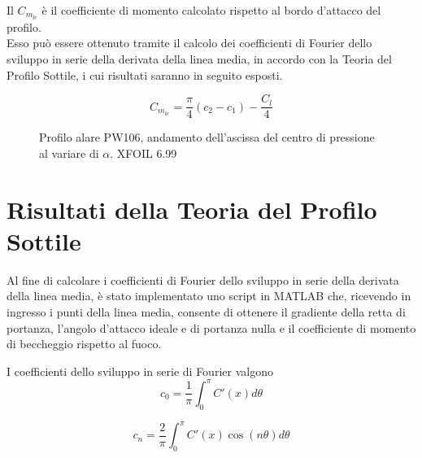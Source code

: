 Il $ C_{m_{le}}$ è il coefficiente di momento calcolato rispetto al bordo d’attacco del profilo. \\
Esso può essere ottenuto tramite il calcolo dei coefficienti di Fourier dello sviluppo in serie della derivata della linea media, in accordo con la Teoria del Profilo Sottile, i cui risultati saranno in seguito esposti.

\begin{equation}
\label{eqn:zerouno}
C_{m_{le}}= \frac {{\pi}}{4}(c_2-c_1)- \frac {C_l}{4}
\end{equation}

\begin{figure} [h!]
\centering
{}
\caption{\footnotesize Profilo alare PW106, andamento dell'ascissa del centro di pressione al variare di ${\alpha}$.  XFOIL 6.99}\label{fig:cp}
\end{figure}


\section{Risultati della Teoria del Profilo Sottile}

Al fine di calcolare i coefficienti di Fourier dello sviluppo in serie della derivata della linea media, è stato implementato uno script in MATLAB che, ricevendo in ingresso i punti della linea media, consente di ottenere il gradiente della retta di portanza, l’angolo d’attacco ideale e di portanza nulla e il coefficiente di momento di beccheggio rispetto al fuoco.

I coefficienti dello sviluppo in serie di Fourier valgono\\

\begin{equation}
\label{eqn:prima}
c_0= \frac {1}{{\pi}}\int_0^{\pi} C'(x) d{\theta}
\end{equation}

\begin{equation}
\label{eqn:seconda}
c_n= \frac {2}{{\pi}}\int_0^{\pi} C'(x) {\cos}(n{\theta}) d{\theta}
\end{equation}


